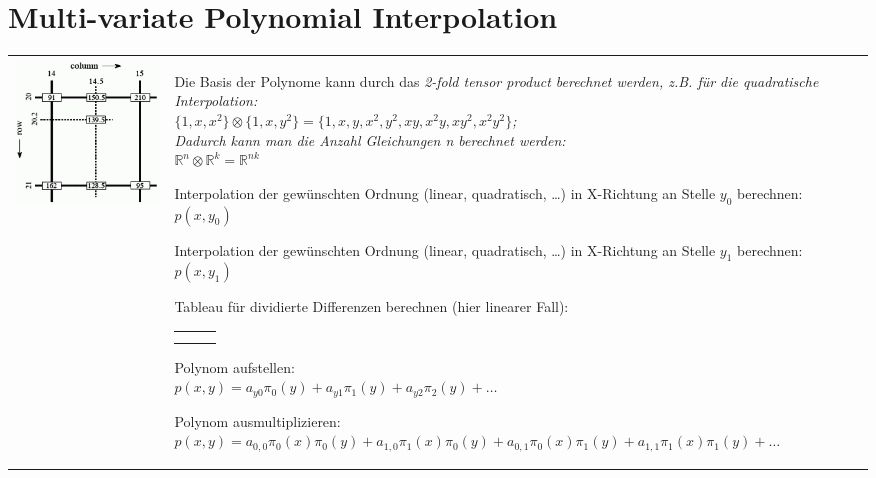 \section{Multi-variate Polynomial Interpolation}
\begin{tabular}{ll}
  \parbox{6cm}{
    \includegraphics[width=6cm]{./bilder/bilineare_interpolation}
  }
  & \parbox{12.5cm} {
    \begin{aufzaehlung}
      \item 
        Die Basis der Polynome kann durch das \em 2-fold tensor product \em berechnet werden, z.B. für 
        die quadratische Interpolation:\\
        $\{1,x,x^2\} \otimes \{1, x, y^2\} = \{1,x,y,x^2,y^2,xy, x^2y, xy^2, x^2y^2\}$; \\
        Dadurch kann man die Anzahl Gleichungen n berechnet werden: \\$\mathbb R^n \otimes \mathbb R^k = \mathbb R^{nk}$
      \item Interpolation der gewünschten Ordnung (linear, quadratisch, \ldots) in X-Richtung an 
        Stelle $y_0$ berechnen: $p(x,y_0)$
      \item Interpolation der gewünschten Ordnung (linear, quadratisch, \ldots) in X-Richtung an 
        Stelle $y_1$ berechnen: $p(x,y_1)$
      \item Tableau für dividierte Differenzen berechnen (hier linearer Fall):\\
        \begin{tabular}{l|ll}
          $y$ & $z$\\
          \hline
          $y_0$ & $p(x,y_0) = a_{y0}$\\
          $y_1$ & $p(x,y_1)$ & $\frac{p(x,y_1) - p(x,y_0)}{y_1-y_0} = a_{y1}$
        \end{tabular}
      \item Polynom aufstellen:\\
        $p(x,y) = a_{y0} \pi_0(y) + a_{y1} \pi_1(y) + a_{y2} \pi_2(y)+\ldots$
      \item Polynom ausmultiplizieren:\\
          $p(x,y) = a_{0,0} \pi_0(x)\pi_0(y) + a_{1,0} \pi_1(x)\pi_0(y) + a_{0,1} \pi_0(x)\pi_1(y) + a_{1,1} \pi_1(x)\pi_1(y)+\ldots$ 
    \end{aufzaehlung}
  }

\end{tabular}

